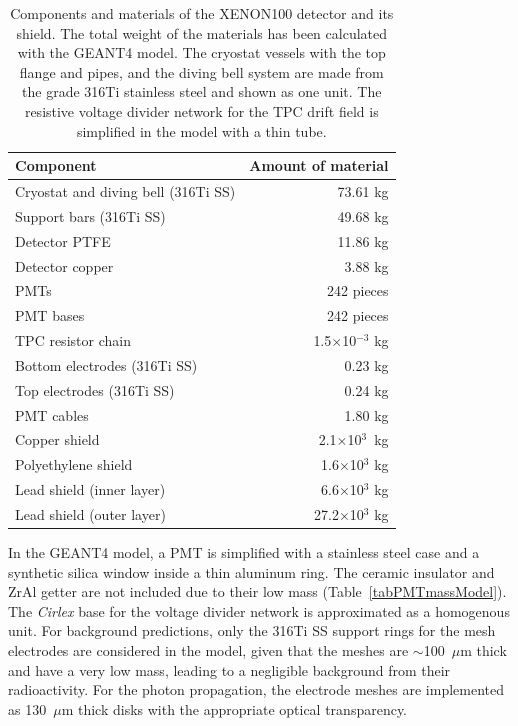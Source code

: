 \begin{table}[!h]
\centering
\caption[Components and materials of the XENON100 detector and its shield]{Components and materials of the XENON100 detector and its shield. The total weight of the materials has been calculated with the GEANT4 model.  The cryostat vessels with the top flange and pipes, and the diving bell system are made from the grade 316Ti stainless steel and shown as one unit. The resistive voltage divider network for the TPC drift field is simplified in the model with a thin tube.}
\label{tabDetectorComponents}
\begin{tabular}{>{\footnotesize}l |>{\footnotesize} r}
\hline
Component 					& Amount of material  \\
\hline
Cryostat and diving bell (316Ti SS) & 73.61 kg 	\\
Support bars (316Ti SS) 			& 49.68 kg 	\\
Detector PTFE 					& 11.86 kg	\\
Detector copper 				& 3.88 kg 		\\
PMTs						& 242 pieces 	\\
PMT bases 					& 242 pieces 	\\
TPC resistor chain 				& 1.5$\times$10$^{-3}$ kg \\
Bottom electrodes (316Ti SS) 		& 0.23 kg 		\\
Top electrodes (316Ti SS) 		& 0.24 kg 		\\
PMT cables					& 1.80 kg 		\\
Copper shield 					& 2.1$\times$10$^{3}$~kg 	\\ 
Polyethylene shield 				& 1.6$\times$10$^{3}$ kg 	\\
Lead shield  (inner layer) 			& 6.6$\times$10$^{3}$ kg 	\\
Lead shield (outer layer) 			& 27.2$\times$10$^{3}$ kg 	\\
\hline
\end{tabular}
\end{table}

In the GEANT4 model, a PMT is simplified with a stainless steel case and a synthetic silica window inside a thin aluminum ring. The ceramic insulator and ZrAl getter are not included due to their low mass (Table~\ref{tabPMTmassModel}). The {\it Cirlex} base for the voltage divider network is approximated as a homogenous unit. 
For background predictions, only the 316Ti SS support rings for the mesh electrodes are considered in the model, given that the meshes are $\sim$100~$\mu$m thick and have a very low mass, leading to a negligible background from their radioactivity. For the photon propagation, the electrode meshes are implemented as 130~$\mu$m thick disks with the appropriate optical transparency.


